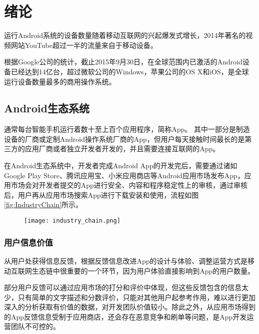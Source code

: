 
\chapter{绪论}
\label{chap:intro}

运行Android系统的设备数量随着移动互联网的兴起爆发式增长，2014年著名的视频网站YouTube超过一半的流量来自于移动设备\parencite{youtube}。

根据Google公司的统计，截止2015年9月30日，在全球范围内已激活的Android设备已经达到14亿台\parencite{android_device}，超过微软公司的Windows，苹果公司的OS X和iOS，是全球运行设备数量最多的商用操作系统。

\section{Android生态系统}
\label{sec:android_ecosystem}

通常每台智能手机运行着数十至上百个应用程序，简称App。
其中一部分是制造设备的厂商或定制Android操作系统厂商的App，但用户每天接触时间最长的是第三方的应用厂商或者独立开发者开发的，并且需要连接互联网的App。

在Android生态系统中，开发者完成Android App的开发完后，需要通过诸如Google Play Store、腾讯应用宝、小米应用商店等Android应用市场发布App，应用市场会对开发者提交的App进行安全、内容和程序稳定性上的审核，通过审核后，用户再从应用市场搜索App进行下载安装和使用，流程如图\ref{fig:IndustryChain}所示。

\begin{figure}[!htp]
	\centering
	\texttt{[image: industry\_chain.png]}
\end{figure}

\subsection{用户信息价值}

从用户处获得信息反馈，根据反馈信息改进App的设计与体验、调整运营方式是移动互联网生态链中很重要的一个环节，因为用户体验直接影响到App的用户数量。

部分用户反馈可以通过应用市场的打分和评价中体现，但这些反馈包含的信息太少，只有简单的文字描述和分数评价，只能对其他用户起参考作用，难以进行更加深入的分析获取有价值的数据，对开发团队价值较小。除此之外，从应用市场得到的App反馈信息受制于应用商店，还会存在恶意竞争和刷单等问题，是App开发运营团队不可控的。

